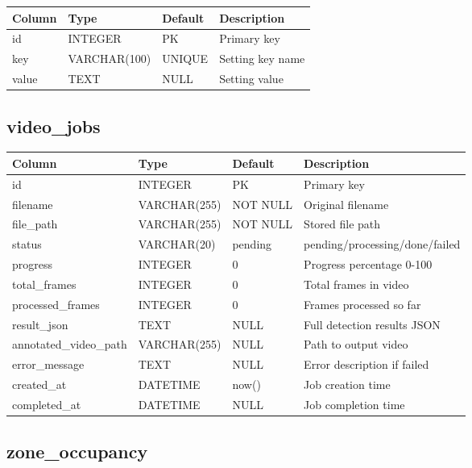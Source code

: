 \documentclass[12pt,a4paper,oneside]{book}
\begin{document}
\begin{tabular}{|l|l|l|p{6cm}|}
    \hline
    \textbf{Column} & \textbf{Type} & \textbf{Default} & \textbf{Description} \\
    \hline
    id & INTEGER & PK & Primary key \\
    \hline
    key & VARCHAR(100) & UNIQUE & Setting key name \\
    \hline
    value & TEXT & NULL & Setting value \\
    \hline
\end{tabular}

\subsection{video\_jobs}

\begin{tabular}{|l|l|l|p{6cm}|}
    \hline
    \textbf{Column} & \textbf{Type} & \textbf{Default} & \textbf{Description} \\
    \hline
    id & INTEGER & PK & Primary key \\
    \hline
    filename & VARCHAR(255) & NOT NULL & Original filename \\
    \hline
    file\_path & VARCHAR(255) & NOT NULL & Stored file path \\
    \hline
    status & VARCHAR(20) & pending & pending/processing/done/failed \\
    \hline
    progress & INTEGER & 0 & Progress percentage 0-100 \\
    \hline
    total\_frames & INTEGER & 0 & Total frames in video \\
    \hline
    processed\_frames & INTEGER & 0 & Frames processed so far \\
    \hline
    result\_json & TEXT & NULL & Full detection results JSON \\
    \hline
    annotated\_video\_path & VARCHAR(255) & NULL & Path to output video \\
    \hline
    error\_message & TEXT & NULL & Error description if failed \\
    \hline
    created\_at & DATETIME & now() & Job creation time \\
    \hline
    completed\_at & DATETIME & NULL & Job completion time \\
    \hline
\end{tabular}

\subsection{zone\_occupancy}
\end{document}
